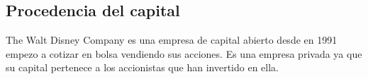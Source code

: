 \subsection{Procedencia del capital}
The Walt Disney Company es una empresa de capital abierto desde en 1991 empezo a cotizar en bolsa vendiendo sus acciones. Es una empresa privada ya que su capital pertenece a los accionistas que han invertido en ella.